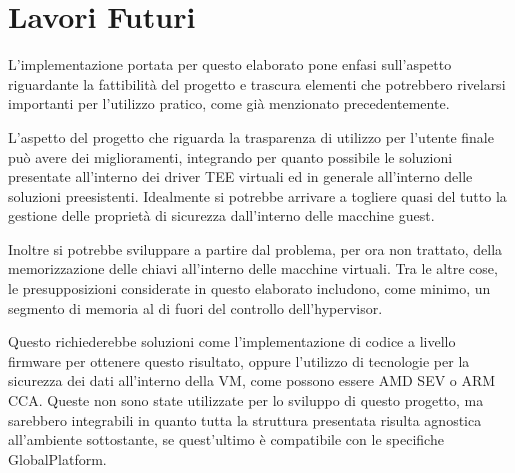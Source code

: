 \documentclass[12pt,italian]{report}
\begin{document}
	\section{Lavori Futuri}
	\label{sec:lavori_futuri}
	L'implementazione portata per questo elaborato pone enfasi sull'aspetto riguardante la fattibilità del progetto e trascura elementi che potrebbero rivelarsi importanti per l'utilizzo pratico, come già menzionato precedentemente. 
	
	L'aspetto del progetto che riguarda la trasparenza di utilizzo per l'utente finale può avere dei miglioramenti, integrando per quanto possibile le soluzioni presentate all'interno dei driver TEE virtuali ed in generale all'interno delle soluzioni preesistenti. Idealmente si potrebbe arrivare a togliere quasi del tutto la gestione delle proprietà di sicurezza dall'interno delle macchine guest.  
	
	\bigbreak
	
	Inoltre si potrebbe sviluppare a partire dal problema, per ora non trattato, della memorizzazione delle chiavi all'interno delle macchine virtuali. Tra le altre cose, le presupposizioni considerate in questo elaborato includono, come minimo, un segmento di memoria al di fuori del controllo dell'hypervisor.
	
	Questo richiederebbe soluzioni come l'implementazione di codice a livello firmware per ottenere questo risultato, oppure l'utilizzo di tecnologie per la sicurezza dei dati all'interno della VM, come possono essere AMD SEV o ARM CCA. Queste non sono state utilizzate per lo sviluppo di questo progetto, ma sarebbero integrabili in quanto tutta la struttura presentata risulta agnostica all'ambiente sottostante, se quest'ultimo è compatibile con le specifiche GlobalPlatform.
	
	
	
	
	
\end{document}
